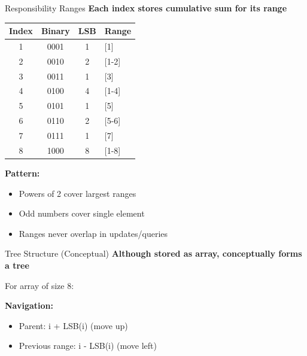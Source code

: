 \documentclass[aspectratio=169]{beamer}
\begin{document}
\begin{frame}{Responsibility Ranges}
  \textbf{Each index stores cumulative sum for its range}

  \vspace{0.3cm}
  \begin{table}
    \centering
    \small
    \begin{tabular}{|c|c|c|l|}
      \hline
      \textbf{Index} & \textbf{Binary} & \textbf{LSB} & \textbf{Range} \\
      \hline
      1 & 0001 & 1 & [1] \\
      2 & 0010 & 2 & [1-2] \\
      3 & 0011 & 1 & [3] \\
      4 & 0100 & 4 & [1-4] \\
      5 & 0101 & 1 & [5] \\
      6 & 0110 & 2 & [5-6] \\
      7 & 0111 & 1 & [7] \\
      8 & 1000 & 8 & [1-8] \\
      \hline
    \end{tabular}
  \end{table}

  \vspace{0.5cm}
  \textbf{Pattern:}
  \begin{itemize}
    \item Powers of 2 cover largest ranges
    \item Odd numbers cover single element
    \item Ranges never overlap in updates/queries
  \end{itemize}
\end{frame}

\begin{frame}{Tree Structure (Conceptual)}
  \textbf{Although stored as array, conceptually forms a tree}

  \vspace{0.3cm}
  For array of size 8:

  \begin{center}
  \end{center}

  \vspace{0.3cm}
  \small
  \textbf{Navigation:}
  \begin{itemize}
    \item Parent: i + LSB(i) (move up)
    \item Previous range: i - LSB(i) (move left)
  \end{itemize}
\end{frame}
\end{document}
